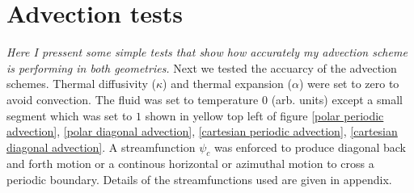 \documentclass{article}
\begin{document}
\section*{Advection tests}
{\it{Here I pressent some simple tests that show how accurately my advection scheme is performing in both geometries.}}
\vspace{0.3cm}
\noindent Next we tested the accuarcy of the advection schemes. Thermal diffusivity ($\kappa$) and thermal expansion ($\alpha$) were set to zero to avoid convection. The fluid was set to temperature 0 (arb. units) except a small segment which was set to $1$ shown in yellow top left of figure \ref{polar periodic advection}, \ref{polar diagonal advection}, \ref{cartesian periodic advection}, \ref{cartesian diagonal advection}. A streamfunction $\psi_c$ was enforced to produce diagonal back and forth motion or a continous horizontal or azimuthal motion to cross a periodic boundary. Details of the streamfunctions used are given in appendix.
\end{document}
